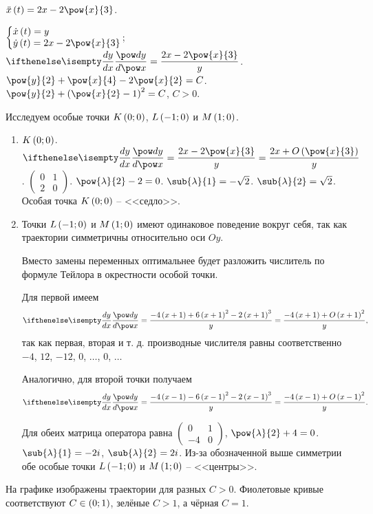 \documentclass[a5paper,10pt]{article}
\begin{document}
$\ddot{x}\br{t} = 2x - 2\pow{x}{3}$.

$\tsys{\dot{x}\br{t} = y \\ \dot{y}\br{t} = 2x - 2\pow{x}{3}}$;
$\der{y}{x} = \dfrac {2x - 2\pow{x}{3}} {y}$.
$\pow{y}{2} + \pow{x}{4} - 2\pow{x}{2} = C$.
$\pow{y}{2} + \br{\pow{x}{2} - 1}^2 = C$, $C > 0$.

Исследуем особые точки $K\left(\hspace{0.01em}0; 0\hspace{0.01em}\right)$, $L\left(\hspace{0.01em}-1; 0\hspace{0.01em}\right)$ и $M\left(\hspace{0.01em}1; 0\hspace{0.01em}\right)$. 

\begin{enumerate}
    \item $K\left(\hspace{0.01em}0; 0\hspace{0.01em}\right)$. $\der{y}{x} = \dfrac {2x - 2\pow{x}{3}} {y} 
    = \dfrac {2x + O\br{\pow{x}{3}}} {y}$.
    $\begin{pmatrix} 0 & 1 \\ 2 & 0 \end{pmatrix}$.
    $\pow{\lambda}{2} - 2 = 0$.
    $\sub{\lambda}{1} = -\sqrt{2}$.
    $\sub{\lambda}{2} = \sqrt{2}$.
    Особая точка $K\left(\hspace{0.01em}0; 0\hspace{0.01em}\right)$ -- <<седло>>.

    \item Точки $L\left(\hspace{0.01em}-1; 0\hspace{0.01em}\right)$ и $M\left(\hspace{0.01em}1; 0\hspace{0.01em}\right)$ имеют одинаковое поведение
    вокруг себя, так как траектории симметричны относительно оси $Oy$.

    Вместо замены переменных оптимальнее будет разложить числитель
    по формуле Тейлора в окрестности особой точки.

    Для первой имеем
    $$\der{y}{x} = \dfrac {-4\br{x + 1} + 6\br{x + 1}^2 - 2\br{x + 1}^3} {y}
    = \dfrac {-4\br{x + 1} + O\br{x + 1}^2} {y},$$
    так как первая, вторая и т. д. производные числителя равны 
    соответственно $-4$, $12$, $-12$, $0$, $\ldots$, $0$, $\ldots$

    Аналогично, для второй точки получаем
    $$\der{y}{x} = \dfrac {-4\br{x - 1} - 6\br{x - 1}^2 - 2\br{x - 1}^3} {y}
    = \dfrac {-4\br{x - 1} + O\br{x - 1}^2} {y}.$$

    Для обеих матрица оператора равна 
    $\begin{pmatrix} 0 & 1 \\ -4 & 0 \end{pmatrix}$,
    $\pow{\lambda}{2} + 4 = 0$.
    $\sub{\lambda}{1} = -2i$, $\sub{\lambda}{2} = 2i$.
    Из-за обозначенной выше симметрии обе особые точки
    $L\left(\hspace{0.01em}-1; 0\hspace{0.01em}\right)$ и $M\left(\hspace{0.01em}1; 0\hspace{0.01em}\right)$ -- <<центры>>.
\end{enumerate}

На графике изображены траектории для разных $C > 0$.
Фиолетовые кривые соответствуют $C \in \left(\hspace{0.01em}0; 1\hspace{0.01em}\right)$, зелёные $C > 1$, 
а чёрная $C = 1$.
\end{document}
